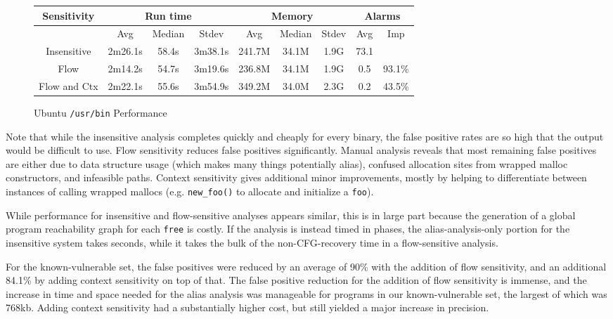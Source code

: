 \begin{figure*}
	\begin{center}
	\begin{tabular}{|c||c|c|c||c|c|c||c|c|}
		\hline
		Sensitivity & \multicolumn{3}{c||}{Run time} & \multicolumn{3}{c||}{Memory} & \multicolumn{2}{c|}{Alarms} \\
		\hline
		& Avg & Median & Stdev & Avg & Median & Stdev  &Avg & Imp\\
		\hline\hline
		Insensitive  & 2m26.1s & 58.4s & 3m38.1s & 241.7M & 34.1M & 1.9G & 73.1 &\\ \hline
		Flow & 2m14.2s & 54.7s & 3m19.6s & 236.8M & 34.1M & 1.9G & 0.5 & 93.1\% \\ \hline
		Flow and Ctx  & 2m22.1s & 55.6s & 3m54.9s & 349.2M & 34.0M & 2.3G & 0.2 & 43.5\% \\ \hline
	\end{tabular}
	\end{center}
	\caption{Ubuntu \texttt{/usr/bin} Performance}
	\label{fig:ubperf}
\end{figure*}

Note that while the insensitive analysis completes quickly and cheaply for every binary, the false positive rates are so high that the output would be difficult to use.
Flow sensitivity reduces false positives significantly.
Manual analysis reveals that most remaining false positives are either due to data structure usage (which makes many things potentially alias), confused allocation sites from wrapped malloc constructors, and infeasible paths.
Context sensitivity gives additional minor improvements, mostly by helping to differentiate between instances of calling wrapped mallocs (e.g. \texttt{new\_foo()} to allocate and initialize a \texttt{foo}).

While performance for insensitive and flow-sensitive analyses appears similar, this is in large part because the generation of a global program reachability graph for each \texttt{free} is costly.
If the analysis is instead timed in phases, the alias-analysis-only portion for the insensitive system takes seconds, while it takes the bulk of the non-CFG-recovery time in a flow-sensitive analysis.

For the known-vulnerable set, the false positives were reduced by an average of 90\% with the addition of flow sensitivity, and an additional 84.1\% by adding context sensitivity on top of that.
The false positive reduction for the addition of flow sensitivity is immense, and the increase in time and space needed for the alias analysis was manageable for programs in our known-vulnerable set, the largest of which was 768kb.
Adding context sensitivity had a substantially higher cost, but still yielded a major increase in precision.


